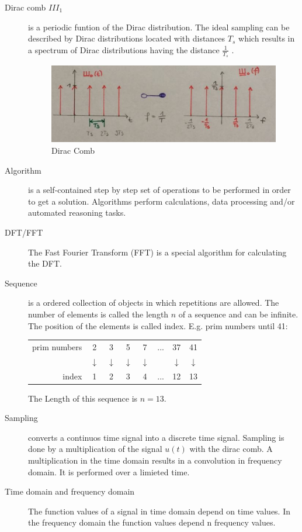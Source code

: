 \begin{description}
\begin{enumerate}
\begin{figure}[!h]
					\label{fig:dirac2}
				\end{figure}				
		\end{enumerate}
	\item[Dirac comb ${III}_1$] is a periodic funtion of the Dirac distribution. The ideal sampling can be described by Dirac distributions located with distances $T_s$ which results in a spectrum of Dirac distributions having the distance $\frac{1}{T_s}$ .
		\begin{figure}[!h]
			\centering
			\includegraphics[width=0.7\linewidth]{images_LA/diraccomb}
			\caption{Dirac Comb}
			\label{fig:diraccomb}
		\end{figure}
	\item[Algorithm] is a self-contained step by step set of operations to be performed in order to get a solution. Algorithms perform calculations, data processing and/or automated reasoning tasks.
	\item[DFT/FFT] The Fast Fourier Transform (FFT) is a special algorithm for calculating the DFT.
	\item[Sequence] is a ordered collection of objects in which repetitions are allowed. The number of elements is called the length $n$ of a sequence and can be infinite. The position of the elements is called index.
	E.g. prim numbers until 41: 
	
	\begin{tabular}{rccccccc} 
		prim numbers &2 & 3 & 5 & 7 & ... & 37 & 41 \\  
		& $\downarrow$ & $\downarrow$ & $\downarrow$ & $\downarrow$ &  & $\downarrow$ &   $\downarrow$ \\ 
		index & 1 & 2 & 3 & 4 & ...   & 12 & 13 \\ 
	\end{tabular} 
	
	The Length of this sequence is $n=13$.
	
	\item[Sampling] converts a continuos time signal into a discrete time signal. Sampling is done by a multiplication of the signal $u(t)$ with the dirac comb. A multiplication in the time domain results in a convolution in frequency domain. It is performed over a limieted time.
	\item[Time domain and frequency domain] The function values of a signal in time domain depend on time values. In the frequency domain the function values depend n frequency values.
	

\end{description}
